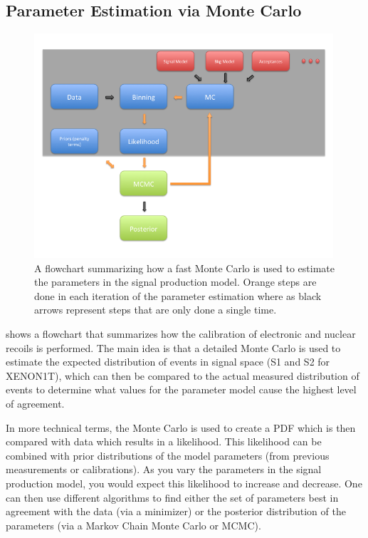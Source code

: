 

\subsection{Parameter Estimation via Monte Carlo}


\begin{figure}
        \centering
	\includegraphics[width=0.99\textwidth]{xe1t_fast_mc_flowchart}
	\caption{A flowchart summarizing how a fast Monte Carlo is used to estimate the parameters in the signal production model.  Orange steps are done in each iteration of the parameter estimation where as black arrows represent steps that are only done a single time.}
	\label{fig:xe1t_fast_mc_flowchart}
\end{figure}


 shows a flowchart that summarizes how the calibration of electronic and nuclear recoils is performed.  The main idea is that a detailed Monte Carlo is used to estimate the expected distribution of events in signal space (S1 and S2 for XENON1T), which can then be compared to the actual measured distribution of events to determine what values for the parameter model cause the highest level of agreement. 

In more technical terms, the Monte Carlo is used to create a PDF which is then compared with data which results in a likelihood.  This likelihood can be combined with prior distributions of the model parameters (from previous measurements or calibrations).  As you vary the parameters in the signal production model, you would expect this likelihood to increase and decrease.  One can then use different algorithms to find either the set of parameters best in agreement with the data (via a minimizer) or the posterior distribution of the parameters (via a Markov Chain Monte Carlo or MCMC).

